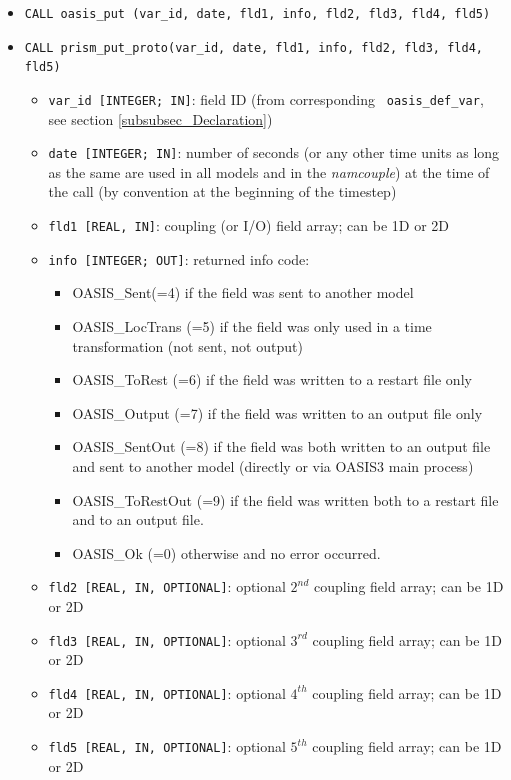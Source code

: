 \begin{itemize}
\item {\tt CALL oasis\_put (var\_id, date, fld1, info, fld2, fld3,
    fld4, fld5)}
\item {\tt CALL prism\_put\_proto(var\_id, date, fld1, info, fld2,
    fld3, fld4, fld5)}
  \begin{itemize}
  \item {\tt var\_id [INTEGER; IN]}: field ID (from corresponding {\tt
      oasis\_def\_var}, see section \ref{subsubsec_Declaration})
  \item {\tt date [INTEGER; IN]}: number of seconds (or any other time
    units as long as the same are used in all models and in the {\it
      namcouple}) at the time of the call (by convention at the
    beginning of the timestep)
  \item {\tt fld1 [REAL, IN]}: coupling (or I/O) field array; can be
    1D or 2D
  \item {\tt info [INTEGER; OUT]}: returned info code:
    \begin{itemize}
    \item OASIS\_Sent(=4) if the field was sent to another model
    \item OASIS\_LocTrans (=5) if the field was only used in a time
      transformation (not sent, not output)
    \item OASIS\_ToRest (=6) if the field was written to a restart
      file only
    \item OASIS\_Output (=7) if the field was written to an output
      file only
    \item OASIS\_SentOut (=8) if the field was both written to an
      output file and sent to another model (directly or via OASIS3
      main process)
    \item OASIS\_ToRestOut (=9) if the field was written both to a
      restart file and to an output file.
    \item OASIS\_Ok (=0) otherwise and no error occurred.
    \end{itemize}
  \item {\tt fld2 [REAL, IN, OPTIONAL]}: optional $2^{nd}$ coupling
    field array; can be 1D or 2D
  \item {\tt fld3 [REAL, IN, OPTIONAL]}: optional $3^{rd}$ coupling
    field array; can be 1D or 2D
  \item {\tt fld4 [REAL, IN, OPTIONAL]}: optional $4^{th}$ coupling
    field array; can be 1D or 2D
  \item {\tt fld5 [REAL, IN, OPTIONAL]}: optional $5^{th}$ coupling
    field array; can be 1D or 2D
  \end{itemize}
\end{itemize}

